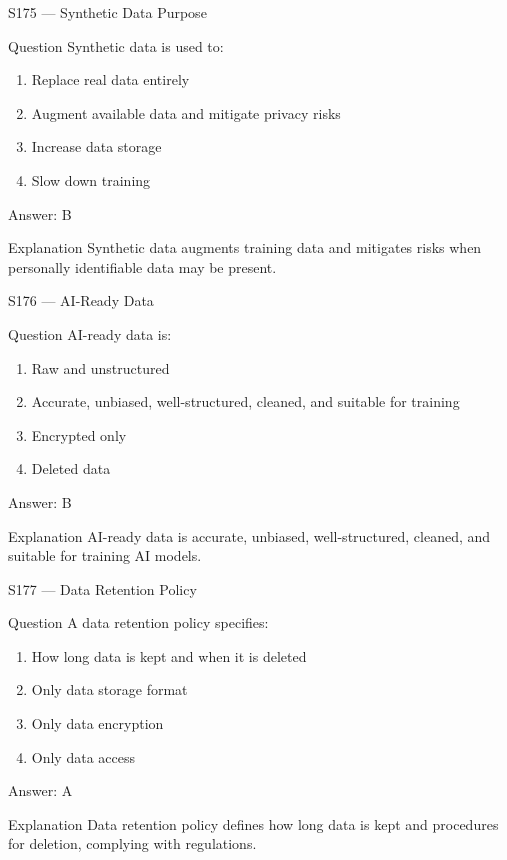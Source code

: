 \documentclass[aspectratio=169,8pt]{beamer}
\begin{document}
	\begin{frame}{S175 --- Synthetic Data Purpose}
		\begin{block}{Question}
			Synthetic data is used to:
			\begin{enumerate}
				\item Replace real data entirely
				\item Augment available data and mitigate privacy risks
				\item Increase data storage
				\item Slow down training
			\end{enumerate}
		\end{block}
		\begin{exampleblock}{Answer: B}\end{exampleblock}
		\begin{block}{Explanation}
			Synthetic data augments training data and mitigates risks when personally identifiable data may be present.
		\end{block}
	\end{frame}
	
	\begin{frame}{S176 --- AI-Ready Data}
		\begin{block}{Question}
			AI-ready data is:
			\begin{enumerate}
				\item Raw and unstructured
				\item Accurate, unbiased, well-structured, cleaned, and suitable for training
				\item Encrypted only
				\item Deleted data
			\end{enumerate}
		\end{block}
		\begin{exampleblock}{Answer: B}\end{exampleblock}
		\begin{block}{Explanation}
			AI-ready data is accurate, unbiased, well-structured, cleaned, and suitable for training AI models.
		\end{block}
	\end{frame}
	
	\begin{frame}{S177 --- Data Retention Policy}
		\begin{block}{Question}
			A data retention policy specifies:
			\begin{enumerate}
				\item How long data is kept and when it is deleted
				\item Only data storage format
				\item Only data encryption
				\item Only data access
			\end{enumerate}
		\end{block}
		\begin{exampleblock}{Answer: A}\end{exampleblock}
		\begin{block}{Explanation}
			Data retention policy defines how long data is kept and procedures for deletion, complying with regulations.
		\end{block}
	\end{frame}
	
\end{document}
